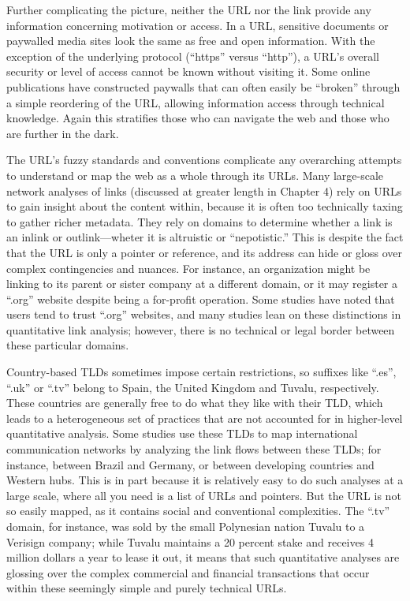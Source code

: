 Further complicating the picture, neither the URL nor the link provide any information concerning motivation or access. In a URL, sensitive documents or paywalled media sites look the same as free and open information. With the exception of the underlying protocol (``https'' versus ``http''), a URL's overall security or level of access cannot be known without visiting it. Some online publications have constructed paywalls that can often easily be ``broken'' through a simple reordering of the URL, allowing information access through technical knowledge.\autocite{find cite for this?} Again this stratifies those who can navigate the web and those who are further in the dark.

The URL's fuzzy standards and conventions complicate any overarching attempts to understand or map the web as a whole through its URLs. Many large-scale network analyses of links (discussed at greater length in Chapter 4) rely on URLs to gain insight about the content within, because it is often too technically taxing to gather richer metadata. They rely on domains to determine whether a link is an inlink or outlink---wheter it is altruistic or ``nepotistic.''\autocite[213]{chakrabarti_mining_2003} This is despite the fact that the URL is only a pointer or reference, and its address can hide or gloss over complex contingencies and nuances. For instance, an organization might be linking to its parent or sister company at a different domain, or it may register a ``.org'' website despite being a for-profit operation. Some studies have noted that users tend to trust ``.org'' websites, and many studies lean on these distinctions in quantitative link analysis; however, there is no technical or legal border between these particular domains.\autocite{find cite for this?}

Country-based TLDs sometimes impose certain restrictions, so suffixes like ``.es'', ``.uk'' or ``.tv'' belong to Spain, the United Kingdom and Tuvalu, respectively. These countries are generally free to do what they like with their TLD, which leads to a heterogeneous set of practices that are not accounted for in higher-level quantitative analysis. Some studies use these TLDs to map international communication networks by analyzing the link flows between these TLDs; for instance, between Brazil and Germany, or between developing countries and Western hubs.\autocite{chung_inferring_2013,fragoso_understanding_2011,himelboim_international_2010} This is in part because it is relatively easy to do such analyses at a large scale, where all you need is a list of URLs and pointers. But the URL is not so easily mapped, as it contains social and conventional complexities. The ``.tv'' domain, for instance, was sold by the small Polynesian nation Tuvalu to a Verisign company; while Tuvalu maintains a 20 percent stake and receives 4 million dollars a year to lease it out, it means that such quantitative analyses are glossing over the complex commercial and financial transactions that occur within these seemingly simple and purely technical URLs.\autocite{(find cite for this)}

